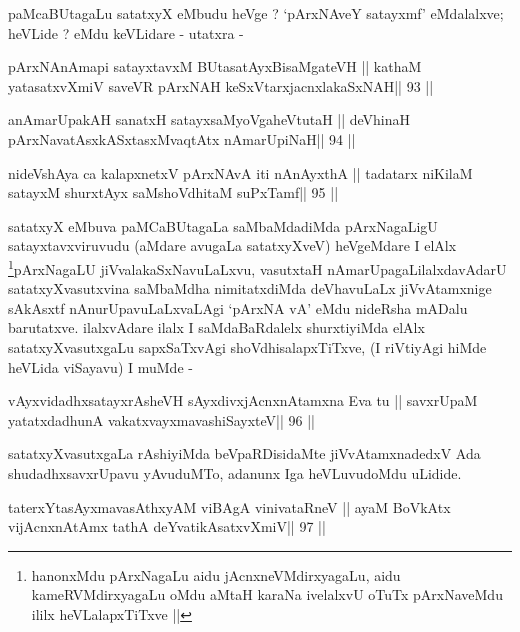 \begin{artha}
paMcaBUtagaLu satatxyX eMbudu heVge ? `pArxNAveY satayxmf' eMdalalxve;
heVLide ? eMdu keVLidare - utatxra -
\end{artha}

\begin{shl}
pArxNAnAmapi satayxtavxM \footnotemark[1]BUtasatAyxBisaMgateVH ||
kathaM yatasatxvXmiV saveVR pArxNAH keSxVtarxjacnxlakaSxNAH\hfill || 93 ||
\end{shl}

\begin{shl}
anAmarUpakAH sanatxH satayxsaMyoVgaheVtutaH ||
deVhinaH pArxNavatAsxkASxtasxMvaqtAtx nAmarUpiNaH\hfill || 94 ||
\end{shl}

\begin{shl}
nideVshAya ca kalapxnetxV pArxNAvA iti  nAnAyxthA ||
tadatarx niKilaM satayxM shurxtAyx saMshoVdhitaM suPxTamf\hfill || 95 ||
\end{shl}

\begin{artha}
satatxyX eMbuva paMCaBUtagaLa saMbaMdadiMda pArxNagaLigU
satayxtavxviruvudu (aMdare avugaLa satatxyXveV) heVgeMdare I
elAlx \footnote[1]{hanonxMdu pArxNagaLu aidu jAcnxneVMdirxyagaLu, aidu
kameRVMdirxyagaLu oMdu aMtaH karaNa ivelalxvU oTuTx pArxNaveMdu ililx
heVLalapxTiTxve ||}pArxNagaLU jiVvalakaSxNavuLaLxvu, vasutxtaH
nAmarUpagaLilalxdavAdarU satatxyXvasutxvina saMbaMdha nimitatxdiMda
deVhavuLaLx jiVvAtamxnige sAkAsxtf nAnurUpavuLaLxvaLAgi `pArxNA vA'
eMdu nideRsha mADalu barutatxve. ilalxvAdare ilalx I saMdaBaRdalelx
shurxtiyiMda elAlx satatxyXvasutxgaLu sapxSaTxvAgi
shoVdhisalapxTiTxve, (I riVtiyAgi hiMde heVLida viSayavu) I muMde -
\end{artha}

\begin{shl}
vAyxvidadhxsatayxrAsheVH sAyxdivxjAcnxnAtamxna Eva tu ||
savxrUpaM yatatxdadhunA vakatxvayxmavashiSayxteV\hfill || 96 ||
\end{shl}

\begin{artha}
satatxyXvasutxgaLa rAshiyiMda beVpaRDisidaMte jiVvAtamxnadedxV Ada
shudadhxsavxrUpavu yAvuduMTo, adanunx Iga heVLuvudoMdu uLidide.
\end{artha}

\begin{shl}
taterxYtasAyxmavasAthxyAM viBAgA vinivataRneV ||
ayaM BoVkAtx vijAcnxnAtAmx tathA deYvatikAsatxvXmiV\hfill || 97 ||
\end{shl}

